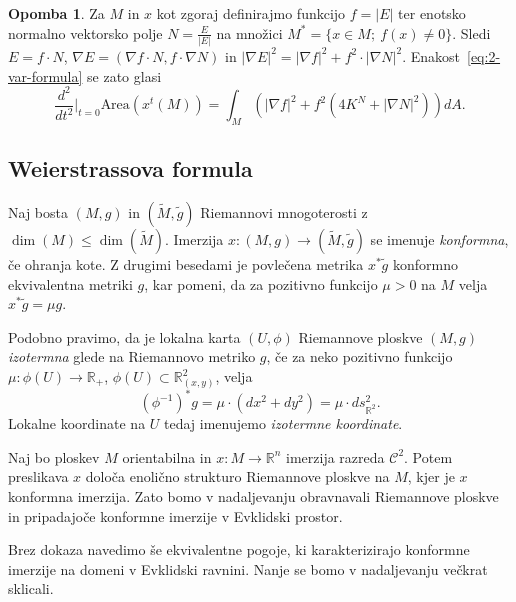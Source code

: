\documentclass[12pt,a4paper,twoside]{article}
\theoremstyle{definition} %
\newtheorem{opomba}[definicija]{Opomba}
\theoremstyle{plain} %
\numberwithin{equation}{section}  %
\newcommand{\R}{\mathbb R}
\begin{document}
\begin{opomba}
Za $M$ in $x$ kot zgoraj definirajmo funkcijo $f = |E|$ ter enotsko normalno vektorsko polje $N = \frac{E}{|E|}$ na množici $M^{*} = \{ x \in M ; \ f(x) \neq 0 \}$. Sledi $E = f \cdot N$, $\nabla E = (\nabla f \cdot N, f \cdot \nabla N)$ in $|\nabla E|^2 = |\nabla f|^2 + f^2 \cdot |\nabla N|^2$.
Enakost~\eqref{eq:2-var-formula} se zato glasi
\begin{equation}
\frac{d^2}{dt^2} \Big|_{t=0} \text{Area} \left(x^{t}(M)\right) = \int_{M} {\left( |\nabla f|^2 + f^2 (4K^{N} + |\nabla N|^2) \right) dA}.
\end{equation}
\end{opomba}

\subsection{Weierstrassova formula}
%
Naj bosta $(M,g)$ in $(\widetilde{M},\tilde{g})$ Riemannovi mnogoterosti z $\dim(M) \leq \dim(\widetilde{M})$.
Imerzija $x \colon (M,g) \to (\widetilde{M}, \tilde{g})$ se imenuje \emph{konformna}, če ohranja kote.
Z drugimi besedami je povlečena metrika $x^{*}\tilde{g}$ konformno ekvivalentna metriki $g$, kar pomeni, da za pozitivno funkcijo $\mu > 0$ na $M$ velja $x^{*}\tilde{g} = \mu g$.

Podobno pravimo, da je lokalna karta $(U, \phi)$ Riemannove ploskve $(M,g)$ \emph{izotermna} glede na Riemannovo metriko $g$, če za neko pozitivno funkcijo $\mu \colon \phi(U) \to \mathbb{R}_{+}$, $\phi(U) \subset \mathbb{R}_{(x,y)}^2$, velja
\begin{equation}
(\phi^{-1})^{*}g = \mu \cdot (dx^2+dy^2) = \mu \cdot ds_{\mathbb{R}^2}^2.
\end{equation} 
Lokalne koordinate na $U$ tedaj imenujemo \emph{izotermne koordinate}.

Naj bo ploskev $M$ orientabilna in $x \colon M \to \R^{n}$ imerzija razreda $\mathcal{C}^2$. Potem preslikava $x$ določa enolično strukturo Riemannove ploskve na $M$, kjer je $x$ konformna imerzija. Zato bomo v nadaljevanju obravnavali Riemannove ploskve in pripadajoče konformne imerzije v Evklidski prostor.

Brez dokaza navedimo še ekvivalentne pogoje, ki karakterizirajo konformne imerzije na domeni v Evklidski ravnini. Nanje se bomo v nadaljevanju večkrat sklicali.
\end{document}
